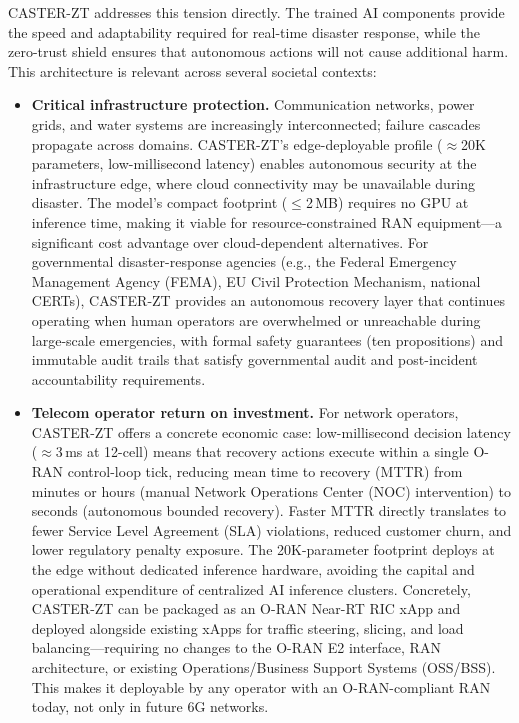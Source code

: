 \documentclass[10pt,journal,compsoc]{IEEEtran}
\begin{document}
CASTER-ZT addresses this tension directly.
The trained AI components provide the speed and adaptability required for real-time disaster response, while the zero-trust shield ensures that autonomous actions will not cause additional harm.
This architecture is relevant across several societal contexts:
\begin{itemize}
    \item \textbf{Critical infrastructure protection.}  Communication networks, power grids, and water systems are increasingly interconnected; failure cascades propagate across domains.  CASTER-ZT's edge-deployable profile ($\approx$20K parameters, low-millisecond latency) enables autonomous security at the infrastructure edge, where cloud connectivity may be unavailable during disaster.  The model's compact footprint ($\le$2\,MB) requires no GPU at inference time, making it viable for resource-constrained RAN equipment---a significant cost advantage over cloud-dependent alternatives.
    For governmental disaster-response agencies (e.g., the Federal Emergency Management Agency (FEMA), EU Civil Protection Mechanism, national CERTs), CASTER-ZT provides an autonomous recovery layer that continues operating when human operators are overwhelmed or unreachable during large-scale emergencies, with formal safety guarantees (ten propositions) and immutable audit trails that satisfy governmental audit and post-incident accountability requirements.
    \item \textbf{Telecom operator return on investment.}  For network operators, CASTER-ZT offers a concrete economic case: low-millisecond decision latency ($\approx$3\,ms at 12-cell) means that recovery actions execute within a single O-RAN control-loop tick, reducing mean time to recovery (MTTR) from minutes or hours (manual Network Operations Center (NOC) intervention) to seconds (autonomous bounded recovery).  Faster MTTR directly translates to fewer Service Level Agreement (SLA) violations, reduced customer churn, and lower regulatory penalty exposure.  The 20K-parameter footprint deploys at the edge without dedicated inference hardware, avoiding the capital and operational expenditure of centralized AI inference clusters.
    Concretely, CASTER-ZT can be packaged as an O-RAN Near-RT RIC xApp and deployed alongside existing xApps for traffic steering, slicing, and load balancing---requiring no changes to the O-RAN E2 interface, RAN architecture, or existing Operations/Business Support Systems (OSS/BSS).  This makes it deployable by any operator with an O-RAN-compliant RAN today, not only in future 6G networks.

\end{itemize}
\end{document}
